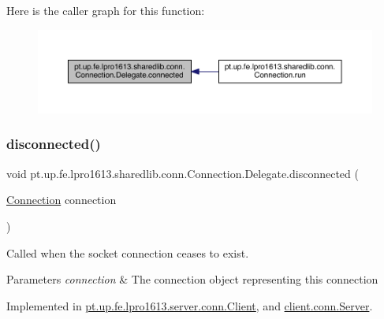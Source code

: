 Here is the caller graph for this function\+:
\nopagebreak
\begin{figure}[H]
\begin{center}
\leavevmode
\includegraphics[width=350pt]{interfacept_1_1up_1_1fe_1_1lpro1613_1_1sharedlib_1_1conn_1_1_connection_1_1_delegate_afeb3c54ced46916733df2ba0b0e2d87e_icgraph}
\end{center}
\end{figure}
\hypertarget{interfacept_1_1up_1_1fe_1_1lpro1613_1_1sharedlib_1_1conn_1_1_connection_1_1_delegate_a39547a28a5b1818ca952e8d3d8da15ba}{}\label{interfacept_1_1up_1_1fe_1_1lpro1613_1_1sharedlib_1_1conn_1_1_connection_1_1_delegate_a39547a28a5b1818ca952e8d3d8da15ba} 
\subsubsection{\texorpdfstring{disconnected()}{disconnected()}}
{\footnotesize\ttfamily void pt.\+up.\+fe.\+lpro1613.\+sharedlib.\+conn.\+Connection.\+Delegate.\+disconnected (\begin{DoxyParamCaption}\item[{\hyperlink{classpt_1_1up_1_1fe_1_1lpro1613_1_1sharedlib_1_1conn_1_1_connection}{Connection}}]{connection }\end{DoxyParamCaption})}

Called when the socket connection ceases to exist.


\begin{DoxyParams}{Parameters}
{\em connection} & The connection object representing this connection \\
\hline
\end{DoxyParams}


Implemented in \hyperlink{classpt_1_1up_1_1fe_1_1lpro1613_1_1server_1_1conn_1_1_client_a8aaec34bb1c5d5af0430318b105ac3fc}{pt.\+up.\+fe.\+lpro1613.\+server.\+conn.\+Client}, and \hyperlink{classclient_1_1conn_1_1_server_ae2a0ab226b1622da8e19137fb89bdc81}{client.\+conn.\+Server}.

